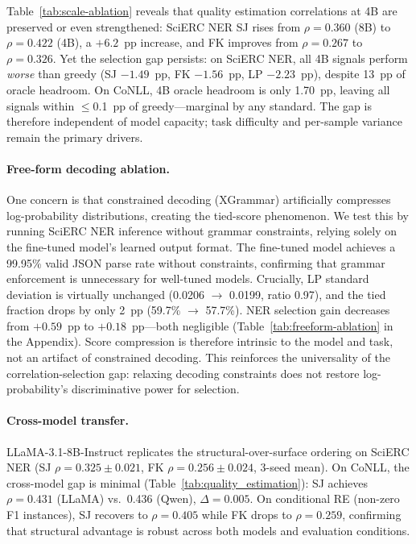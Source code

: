 Table~\ref{tab:scale-ablation} reveals that quality estimation correlations at 4B are preserved or even strengthened: SciERC NER SJ rises from $\rho{=}0.360$ (8B) to $\rho{=}0.422$ (4B), a $+6.2$~pp increase, and FK improves from $\rho{=}0.267$ to $\rho{=}0.326$.
Yet the selection gap persists: on SciERC NER, all 4B signals perform \textit{worse} than greedy (SJ $-1.49$~pp, FK $-1.56$~pp, LP $-2.23$~pp), despite 13~pp of oracle headroom.
On CoNLL, 4B oracle headroom is only 1.70~pp, leaving all signals within $\leq$0.1~pp of greedy---marginal by any standard.
The gap is therefore independent of model capacity; task difficulty and per-sample variance remain the primary drivers.

\paragraph{Free-form decoding ablation.}
One concern is that constrained decoding (XGrammar) artificially compresses log-probability distributions, creating the tied-score phenomenon.
We test this by running SciERC NER inference without grammar constraints, relying solely on the fine-tuned model's learned output format.
The fine-tuned model achieves a 99.95\% valid JSON parse rate without constraints, confirming that grammar enforcement is unnecessary for well-tuned models.
Crucially, LP standard deviation is virtually unchanged (0.0206 $\to$ 0.0199, ratio 0.97), and the tied fraction drops by only 2~pp (59.7\% $\to$ 57.7\%).
NER selection gain decreases from $+0.59$~pp to $+0.18$~pp---both negligible (Table~\ref{tab:freeform-ablation} in the Appendix).
Score compression is therefore intrinsic to the model and task, not an artifact of constrained decoding.
This reinforces the universality of the correlation-selection gap: relaxing decoding constraints does not restore log-probability's discriminative power for selection.

\paragraph{Cross-model transfer.}
LLaMA-3.1-8B-Instruct replicates the structural-over-surface ordering on SciERC NER (SJ $\rho{=}0.325{\pm}0.021$, FK $\rho{=}0.256{\pm}0.024$, 3-seed mean).
On CoNLL, the cross-model gap is minimal (Table~\ref{tab:quality_estimation}): SJ achieves $\rho{=}0.431$ (LLaMA) vs.\ 0.436 (Qwen), $\Delta{=}0.005$.
On conditional RE (non-zero F1 instances), SJ recovers to $\rho{=}0.405$ while FK drops to $\rho{=}0.259$, confirming that structural advantage is robust across both models and evaluation conditions.

